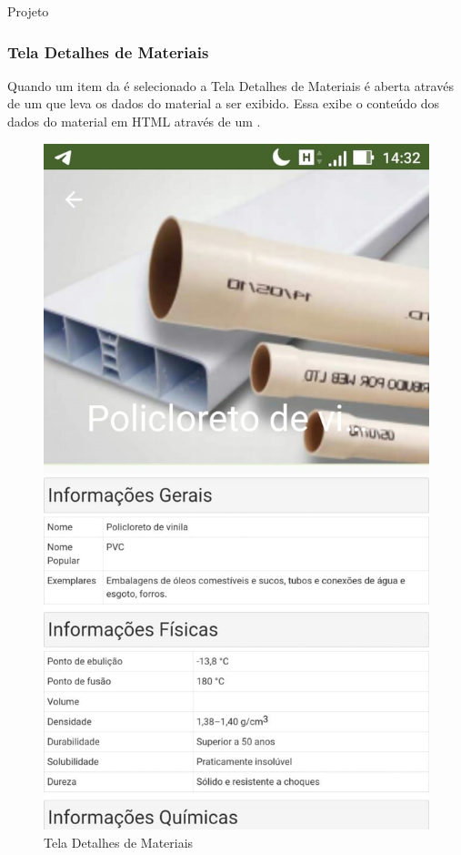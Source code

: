 \documentclass[
	12pt,				%
	openany,			%
	twoside,			%
	a4paper,			%
	english,			%
	french,				%
	spanish,			%
	brazil				%
	]{abntex2}
\begin{document}
\begin{chapter}{Projeto}
\newpage
\subsubsection{Tela Detalhes de Materiais} \label{ActivityMaterialDetails}
Quando um item da  é selecionado a Tela Detalhes de Materiais é aberta através de um  que leva os dados do material a ser exibido. Essa  exibe o conteúdo dos dados do material em HTML através de um .

    \begin{figure}[htb]    
 \centering
  \begin{minipage}{0.45\textwidth}
    \centering
    \caption{Tela Detalhes de Materiais}
    \includegraphics[scale=0.35]{media/tela_material__details_act_1.jpg}

\end{minipage}
\end{figure}
\end{chapter}
\end{document}
